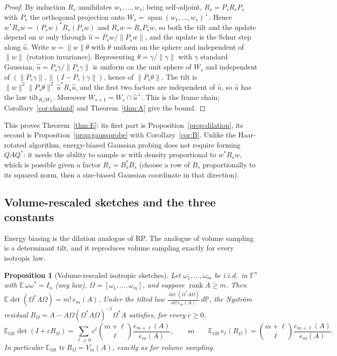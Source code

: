 \documentclass[11pt,a4paper]{article}
\newtheorem{proposition}[theorem]{Proposition}
\theoremstyle{definition}
\newcommand{\E}{\mathbb{E}}
\newcommand{\PP}{\mathbb{P}}
\newcommand{\F}{\mathbb{F}}
\newcommand{\tr}{\operatorname{tr}}
\newcommand{\rank}{\operatorname{rank}}
\newcommand{\tilt}{\mathrm{tilt}}
\begin{document}
\begin{proof}
By induction $R_s$ annihilates $w_1,\dots,w_s$; being self-adjoint, $R_s=P_sR_sP_s$ with $P_s$ the orthogonal projection onto $W_s=\operatorname{span}(w_1,\dots,w_s)^\perp$. Hence $w^*R_sw=(P_sw)^*R_s(P_sw)$ and $R_sw=R_sP_sw$, so both the tilt and the update depend on $w$ only through $\hat u=P_sw/\|P_sw\|$, and the update is the Schur step along $\hat u$. Write $w=\|w\|\theta$ with $\theta$ uniform on the sphere and independent of $\|w\|$ (rotation invariance). Representing $\theta=\gamma/\|\gamma\|$ with $\gamma$ standard Gaussian, $\hat u=P_s\gamma/\|P_s\gamma\|$ is uniform on the unit sphere of $W_s$ and independent of $(\|P_s\gamma\|,\|(I-P_s)\gamma\|)$, hence of $\|P_s\theta\|$. The tilt is $\|w\|^2\|P_s\theta\|^2\,\hat u^*R_s\hat u$, and the first two factors are independent of $\hat u$, so $\hat u$ has the law $\tilt_{R_s|W_s}$. Moreover $W_{s+1}=W_s\cap\hat u^\perp$. This is the frame chain; Corollary~\ref{cor:chainid} and Theorem~\ref{thm:A} give the bound.
\end{proof}

This proves Theorem~\ref{thm:E}: its first part is Proposition~\ref{prop:dilation}, its second is Proposition~\ref{prop:gaussprobe} with Corollary~\ref{cor:B}. Unlike the Haar-rotated algorithm, energy-biased Gaussian probing does not require forming $QAQ^*$: it needs the ability to sample $w$ with density proportional to $w^*R_sw$, which is possible given a factor $R_s=B_s^*B_s$ (choose a row of $B_s$ proportionally to its squared norm, then a size-biased Gaussian coordinate in that direction).

\subsection{Volume-rescaled sketches and the three constants}
Energy biasing is the dilation analogue of RP. The analogue of volume sampling is a determinant tilt, and it reproduces volume sampling exactly for every isotropic law.

\begin{proposition}[Volume-rescaled isotropic sketches]\label{prop:volrescaled}
Let $\omega_1,\dots,\omega_m$ be i.i.d.\ in $\F^n$ with $\E\,\omega\omega^*=I_n$ (any law), $\Omega=[\omega_1,\dots,\omega_m]$, and suppose $\rank A\ge m$. Then $\E\det(\Omega^*A\Omega)=m!\,e_m(A)$. Under the tilted law $\frac{\det(\Omega^*A\Omega)}{m!\,e_m(A)}\,d\PP$, the Nystr\"om residual $R_\Omega=A-A\Omega(\Omega^*A\Omega)^{-1}\Omega^*A$ satisfies, for every $c\ge0$,
\[
\E_\tilt\det(I+cR_\Omega)=\sum_{\ell\ge0}c^\ell\binom{m+\ell}{\ell}\frac{e_{m+\ell}(A)}{e_m(A)},
\qquad\text{so}\qquad \E_\tilt\,e_\ell(R_\Omega)=\binom{m+\ell}{\ell}\frac{e_{m+\ell}(A)}{e_m(A)} .
\]
In particular $\E_\tilt\tr R_\Omega=V_m(A)$, exactly as for volume sampling.
\end{proposition}
\end{document}

